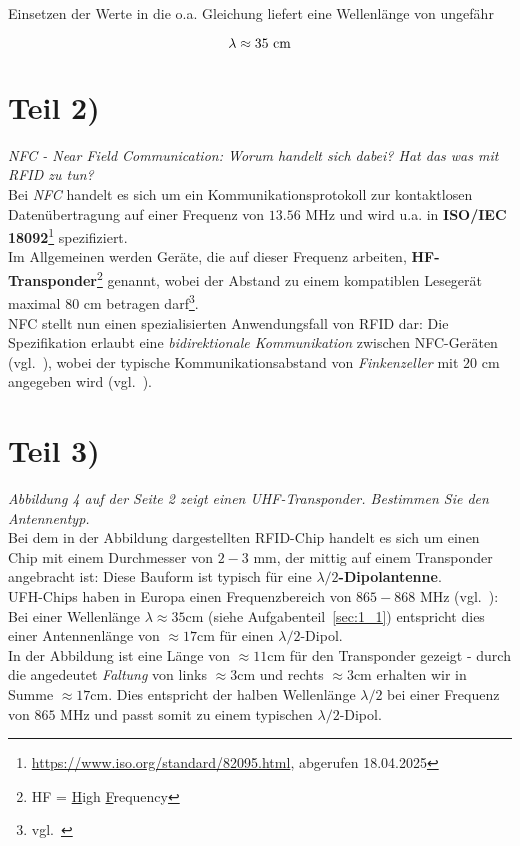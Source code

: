 \noindent
Einsetzen der Werte in die o.a. Gleichung liefert eine Wellenlänge von ungefähr

\begin{equation}\notag
\lambda \approx 35\ \text{cm}
\end{equation}


\section{Teil 2)}

\textit{NFC - Near Field Communication: Worum handelt sich dabei? Hat das was mit RFID zu tun?}\\


\noindent
Bei \textit{NFC} handelt es sich um ein Kommunikationsprotokoll zur kontaktlosen Datenübertragung auf einer Frequenz von $13.56$ MHz und wird u.a. in \textbf{ISO/IEC 18092}\footnote{
    \url{https://www.iso.org/standard/82095.html}, abgerufen 18.04.2025
} spezifiziert.\\

\noindent
Im Allgemeinen werden Geräte, die auf dieser Frequenz arbeiten, \textbf{HF-Transponder}\footnote{HF = \underline{H}igh \underline{F}requency} genannt, wobei der Abstand zu einem kompatiblen Lesegerät maximal $80$ cm betragen darf\footnote{vgl.~\cite[137]{ES5}}.\\

\noindent
NFC stellt nun einen spezialisierten Anwendungsfall von RFID dar: Die Spezifikation erlaubt eine \textit{bidirektionale Kommunikation} zwischen NFC-Geräten (vgl.~\cite[375 f.]{Fin10}), wobei der typische Kommunikationsabstand von \textit{Finkenzeller} mit $20$ cm angegeben wird (vgl.~\cite[57]{Fin10}).

\section{Teil 3)}

\textit{Abbildung 4 auf der Seite 2 zeigt einen UHF-Transponder. Bestimmen
Sie den Antennentyp.}\\

\noindent
Bei dem in der Abbildung dargestellten RFID-Chip handelt es sich um einen Chip mit einem Durchmesser von $2-3$ mm, der mittig auf einem Transponder angebracht ist: Diese Bauform ist typisch für eine \textbf{$\lambda/2$-Dipolantenne}.\\

\noindent
UFH-Chips haben in Europa einen Frequenzbereich von $865-868$ MHz (vgl.~\cite[165]{Fin10}): Bei einer Wellenlänge $\lambda \approx 35$cm (siehe Aufgabenteil~\ref{sec:1_1}) entspricht dies einer Antennenlänge von $\approx 17$cm für einen $\lambda/2$-Dipol.\\

\noindent
In der Abbildung ist eine Länge von $\approx 11$cm für den Transponder gezeigt - durch die angedeutet \textit{Faltung} von links $\approx 3$cm und rechts $\approx 3$cm erhalten wir in Summe $\approx 17$cm.
Dies entspricht der halben Wellenlänge $\lambda / 2$ bei einer Frequenz von $865$ MHz und passt somit zu einem typischen $\lambda/2$-Dipol.
